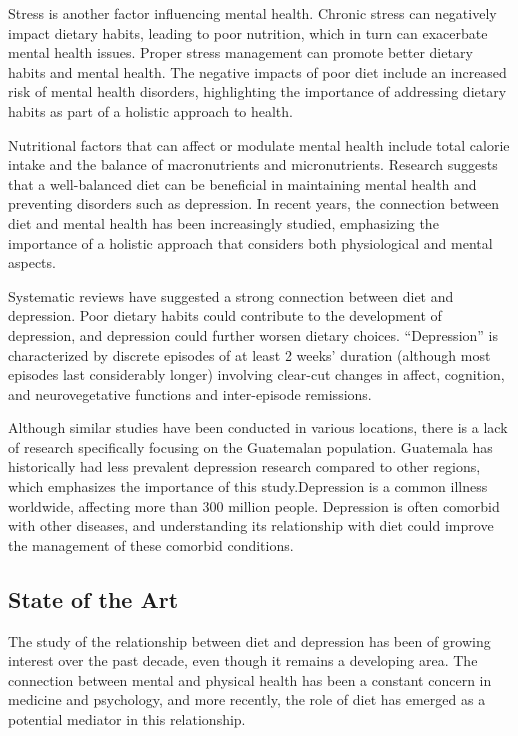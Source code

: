 \documentclass[jou]{apa7}
\begin{document}
	Stress is another factor influencing mental health. Chronic stress can negatively impact dietary habits, leading to poor nutrition, which in turn can exacerbate mental health issues. Proper stress management can promote better dietary habits and mental health. The negative impacts of poor diet include an increased risk of mental health disorders, highlighting the importance of addressing dietary habits as part of a holistic approach to health.

	Nutritional factors that can affect or modulate mental health include total calorie intake and the balance of macronutrients and micronutrients. Research suggests that a well-balanced diet can be beneficial in maintaining mental health and preventing disorders such as depression. In recent years, the connection between diet and mental health has been increasingly studied, emphasizing the importance of a holistic approach that considers both physiological and mental aspects.

	Systematic reviews have suggested a strong connection between diet and depression. Poor dietary habits could contribute to the development of depression, and depression could further worsen dietary choices. ``Depression'' is characterized by discrete episodes of at least 2 weeks' duration (although most episodes last considerably longer) involving clear-cut changes in affect, cognition, and neurovegetative functions and inter-episode remissions\parencite{APA2014}.

	Although similar studies have been conducted in various locations, there is a lack of research specifically focusing on the Guatemalan population. Guatemala has historically had less prevalent depression research compared to other regions, which emphasizes the importance of this study.Depression is a common illness worldwide, affecting more than 300 million people. Depression is often comorbid with other diseases, and understanding its relationship with diet could improve the management of these comorbid conditions. 



\subsection{State of the Art}

The study of the relationship between diet and depression has been of growing interest over the past decade, even though it remains a developing area. The connection between mental and physical health has been a constant concern in medicine and psychology, and more recently, the role of diet has emerged as a potential mediator in this relationship.
\end{document}
